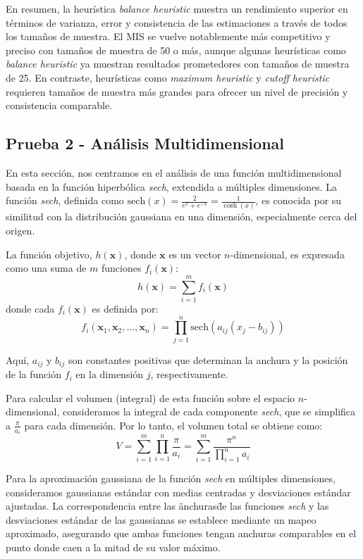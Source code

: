 \documentclass{article}
\begin{document}
En resumen, la heurística \textit{balance heuristic} muestra un rendimiento superior en términos de varianza, error y consistencia de las estimaciones a través de todos los tamaños de muestra. El MIS se vuelve notablemente más competitivo y preciso con tamaños de muestra de 50 o más, aunque algunas heurísticas como \textit{balance heuristic} ya muestran resultados prometedores con tamaños de muestra de 25. En contraste, heurísticas como \textit{maximum heuristic} y \textit{cutoff heuristic} requieren tamaños de muestra más grandes para ofrecer un nivel de precisión y consistencia comparable.

\subsection{Prueba 2 - Análisis Multidimensional}

En esta sección, nos centramos en el análisis de una función multidimensional basada en la función hiperbólica \textit{sech}, extendida a múltiples dimensiones. La función \textit{sech}, definida como \( \text{sech}(x) = \frac{2}{e^x + e^{-x}} = \frac{1}{\cosh(x)} \), es conocida por su similitud con la distribución gaussiana en una dimensión, especialmente cerca del origen.

La función objetivo, \( h(\mathbf{x}) \), donde \( \mathbf{x} \) es un vector \( n \)-dimensional, es expresada como una suma de \( m \) funciones \( f_i(\mathbf{x}) \):
\[ h(\mathbf{x}) = \sum_{i=1}^{m} f_i(\mathbf{x}) \]
donde cada \( f_i(\mathbf{x}) \) es definida por:
\[ f_i(\mathbf{x}_1, \mathbf{x}_2, \ldots, \mathbf{x}_n) = \prod_{j=1}^{n} \text{sech}(a_{ij} (x_j - b_{ij})) \]

Aquí, \( a_{ij} \) y \( b_{ij} \) son constantes positivas que determinan la anchura y la posición de la función \( f_i \) en la dimensión \( j \), respectivamente.

Para calcular el volumen (integral) de esta función sobre el espacio \( n \)-dimensional, consideramos la integral de cada componente \textit{sech}, que se simplifica a \( \frac{\pi}{a_i} \) para cada dimensión. Por lo tanto, el volumen total se obtiene como:
\[ V = \sum_{i=1}^{m} \prod_{i=1}^{n} \frac{\pi}{a_i} = \sum_{i=1}^{m} \frac{\pi^n}{\prod_{i=1}^{n} a_i} \]

Para la aproximación gaussiana de la función \textit{sech} en múltiples dimensiones, consideramos gaussianas estándar con medias centradas y desviaciones estándar ajustadas.
La correspondencia entre las \"anchuras\" de las funciones \textit{sech} y las desviaciones estándar de las gaussianas se establece mediante un mapeo aproximado, asegurando que ambas funciones tengan anchuras comparables en el punto donde caen a la mitad de su valor máximo.
\end{document}
